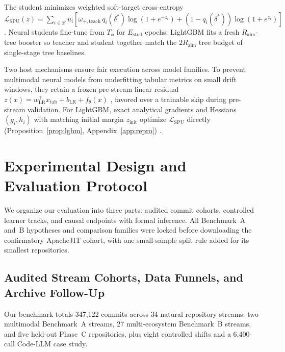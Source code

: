 \documentclass[pdflatex,sn-basic]{sn-jnl}
\theoremstyle{definition}
\theoremstyle{plain}
\begin{document}
The student minimizes weighted soft-target cross-entropy $\mathcal{L}_{\text{SPU}}(z) = \sum_{i \in \mathcal{B}} u_i [\omega_{+,\text{teach}}\, q_i(\delta^*) \log(1 + e^{-z_i}) + (1 - q_i(\delta^*))\log(1 + e^{z_i})]$. Neural students fine-tune from $T_\phi$ for $E_{\text{stud}}$ epochs; LightGBM fits a fresh $R_{\text{alm}}$-tree booster so teacher and student together match the $2R_{\text{alm}}$ tree budget of single-stage tree baselines.

Two host mechanisms ensure fair execution across model families. To prevent multimodal neural models from underfitting tabular metrics on small drift windows, they retain a frozen pre-stream linear residual $z(x) = w_{\text{LR}}^\top x_{\text{tab}} + b_{\text{LR}} + f_\theta(x)$ \citep{zeng2021deep}, favored over a trainable skip during pre-stream validation. For LightGBM, exact analytical gradients and Hessians $(g_i, h_i)$ with matching initial margin $z_{\text{init}}$ optimize $\mathcal{L}_{\text{SPU}}$ directly (Proposition~\ref{prop:lgbm}, Appendix~\ref{app:repro}) \citep{friedman2001greedy,ke2017lightgbm}.

\section{Experimental Design and Evaluation Protocol}
\label{sec:setup}

We organize our evaluation into three parts: audited commit cohorts, controlled learner tracks, and causal endpoints with formal inference. All Benchmark~A and~B hypotheses and comparison families were locked before downloading the confirmatory ApacheJIT cohort, with one small-sample split rule added for its smallest repositories.

\subsection{Audited Stream Cohorts, Data Funnels, and Archive Follow-Up}
\label{sec:benchmarks}

Our benchmark totals 347,122 commits across 34 natural repository streams: two multimodal Benchmark~A streams, 27 multi-ecosystem Benchmark~B streams, and five held-out Phase~C repositories, plus eight controlled shifts and a 6,400-call Code-LLM case study.
\end{document}
